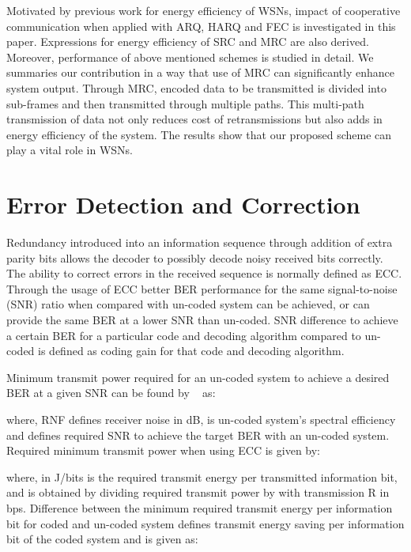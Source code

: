 \documentclass{sig-alternate}
\begin{document}
Motivated by previous work for energy efficiency of WSNs, impact of cooperative communication when applied with ARQ, HARQ and FEC is investigated in this paper. Expressions for energy efficiency of SRC and MRC are also derived. Moreover, performance of above mentioned schemes is studied in detail. We summaries our contribution in a way that use of MRC can significantly enhance system output. Through MRC, encoded data to be transmitted is divided into sub-frames and then transmitted through multiple paths. This multi-path transmission of data not only reduces cost of retransmissions but also adds in energy efficiency of the system. The results show that our proposed scheme can play a vital role in WSNs.

\section{Error Detection and Correction}

Redundancy introduced into an information sequence through addition of extra parity bits allows the decoder to possibly decode noisy received bits correctly. The ability to correct errors in the received sequence is normally defined as ECC. Through the usage of ECC better BER performance for the same signal-to-noise (SNR) ratio when compared with un-coded system can be achieved, or can provide the same BER at a lower SNR than un-coded. SNR difference to achieve a certain BER for a particular code and decoding algorithm compared to un-coded is defined as coding gain for that code and decoding algorithm.

Minimum transmit power required for an un-coded system to achieve a desired BER at a given SNR can be found by ~\cite{1} as:



where, RNF defines receiver noise in dB,  is un-coded system's spectral efficiency and  defines required SNR to achieve the target BER with an un-coded system. Required minimum transmit power when using ECC is given by:



where,  in J/bits is the required transmit energy per transmitted information bit, and is obtained by dividing required transmit power by  with transmission R in bps. Difference between the minimum required transmit energy per information bit for coded and un-coded system defines transmit energy saving per information bit of the coded system and is given as:

\small
 
\end{document}
